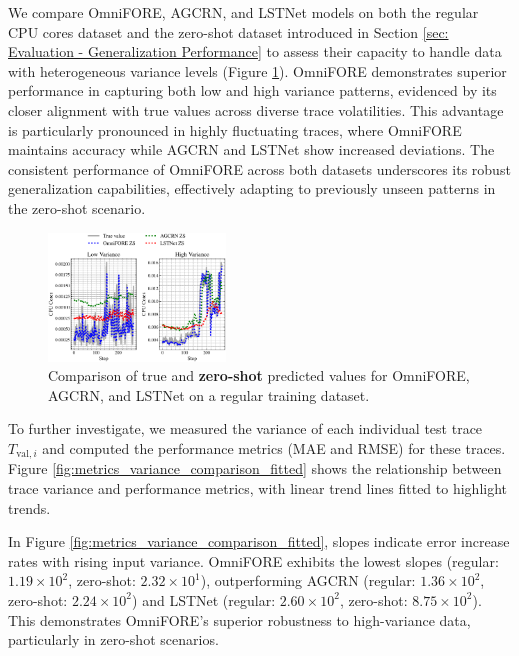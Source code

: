\documentclass{ieeetmlcn}
\begin{document}
We compare OmniFORE, AGCRN, and LSTNet models on both the regular CPU cores dataset and the zero-shot dataset introduced in Section \ref{sec: Evaluation - Generalization Performance} to assess their capacity to handle data with heterogeneous variance levels (Figure \ref{fig:zs_sample_trace_comparison}). OmniFORE demonstrates superior performance in capturing both low and high variance patterns, evidenced by its closer alignment with true values across diverse trace volatilities. This advantage is particularly pronounced in highly fluctuating traces, where OmniFORE maintains accuracy while AGCRN and LSTNet show increased deviations. The consistent performance of OmniFORE across both datasets underscores its robust generalization capabilities, effectively adapting to previously unseen patterns in the zero-shot scenario. 

\begin{figure}\centering%
\centering
\includegraphics[width=0.42\textwidth]{img/zs_sample_trace_comparison.eps}
\caption{Comparison of true and \textbf{zero-shot} predicted values for OmniFORE, AGCRN, and LSTNet on a regular training dataset.}
\label{fig:zs_sample_trace_comparison}
\end{figure}

To further investigate, we measured the variance of each individual test trace $T_{\text{val}, i}$ and computed the performance metrics (MAE and RMSE) for these traces. Figure \ref{fig:metrics_variance_comparison_fitted} shows the relationship between trace variance and performance metrics, with linear trend lines fitted to highlight trends.

In Figure \ref{fig:metrics_variance_comparison_fitted}, slopes indicate error increase rates with rising input variance. OmniFORE exhibits the lowest slopes (regular: $1.19 \times 10^2$, zero-shot: $2.32 \times 10^1$), outperforming AGCRN (regular: $1.36 \times 10^2$, zero-shot: $2.24 \times 10^2$) and LSTNet (regular: $2.60 \times 10^2$, zero-shot: $8.75 \times 10^2$). This demonstrates OmniFORE's superior robustness to high-variance data, particularly in zero-shot scenarios.
\end{document}
